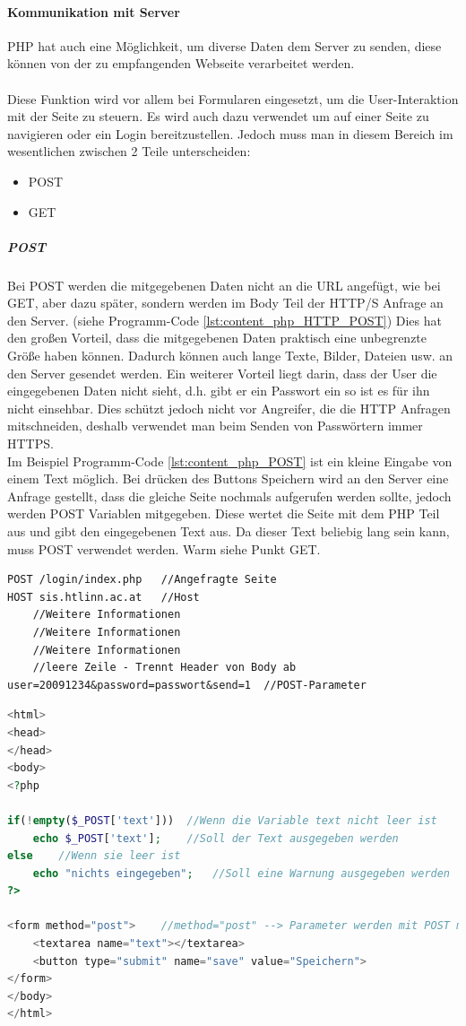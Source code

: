 \paragraph{Kommunikation mit Server}
PHP hat auch eine Möglichkeit, um diverse Daten dem Server zu 
senden, diese können von der zu empfangenden Webseite verarbeitet werden.\\\\
Diese Funktion wird vor allem bei Formularen eingesetzt, um die User-Interaktion mit der Seite zu steuern. Es wird auch dazu verwendet um auf einer Seite zu navigieren oder ein Login bereitzustellen. Jedoch muss man in diesem Bereich im wesentlichen zwischen 2 Teile unterscheiden:
\begin{itemize}
    \item POST
    \item GET
\end{itemize}
\subparagraph{POST}
Bei POST werden die mitgegebenen Daten nicht an die URL angefügt, wie bei GET, aber dazu später, sondern werden im Body Teil der HTTP/S Anfrage an den Server. (siehe Programm-Code \ref{lst:content_php_HTTP_POST}) Dies hat den großen Vorteil, dass die mitgegebenen Daten praktisch eine unbegrenzte Größe haben können. Dadurch können auch lange Texte, Bilder, Dateien usw. an den Server gesendet werden. Ein weiterer Vorteil liegt darin, dass der User die eingegebenen Daten nicht sieht, d.h. gibt er ein Passwort ein so ist es für ihn nicht einsehbar. Dies schützt jedoch nicht vor Angreifer, die die HTTP Anfragen mitschneiden, deshalb verwendet man beim Senden von Passwörtern immer HTTPS.\\
Im Beispiel Programm-Code \ref{lst:content_php_POST} ist ein kleine Eingabe von einem Text möglich. Bei drücken des Buttons Speichern wird an den Server eine Anfrage gestellt, dass die gleiche Seite nochmals aufgerufen werden sollte, jedoch werden POST Variablen mitgegeben. Diese wertet die Seite mit dem PHP Teil aus und gibt den eingegebenen Text aus. Da dieser Text beliebig lang sein kann, muss POST verwendet werden. Warm siehe Punkt GET.
\begin{lstlisting}[style=custom, caption={Ausschnitt HTTP POST Request},label={lst:content_php_HTTP_POST}]
POST /login/index.php	//Angefragte Seite
HOST sis.htlinn.ac.at	//Host
	//Weitere Informationen
	//Weitere Informationen
	//Weitere Informationen
	//leere Zeile - Trennt Header von Body ab
user=20091234&password=passwort&send=1	//POST-Parameter
\end{lstlisting}
\begin{lstlisting}[style=custom, language=PHP, caption={Beispiel POST},label={lst:content_php_POST}]
<html>
<head>
</head>
<body>
<?php

if(!empty($_POST['text']))	//Wenn die Variable text nicht leer ist
	echo $_POST['text'];	//Soll der Text ausgegeben werden
else	//Wenn sie leer ist
	echo "nichts eingegeben";	//Soll eine Warnung ausgegeben werden
?>

<form method="post">	//method="post" --> Parameter werden mit POST mitgegeben
	<textarea name="text"></textarea>
	<button type="submit" name="save" value="Speichern">
</form>
</body>
</html>
\end{lstlisting}
